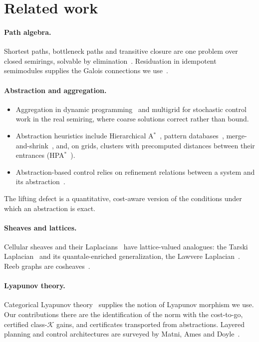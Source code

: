 \documentclass[11pt]{article}
\theoremstyle{definition}
\theoremstyle{remark}
\begin{document}
\section{Related work}

\paragraph{Path algebra.}
Shortest paths, bottleneck paths and transitive closure are one problem over
closed semirings, solvable by elimination~\cite{carre1971,lehmann1977,tarjan1981,
gondran2008}. Residuation in idempotent semimodules supplies the Galois
connections we use~\cite{baccelli1992,cohen2004}.

\paragraph{Abstraction and aggregation.}
\begin{itemize}[nosep]
\item Aggregation in dynamic programming~\cite{bertsekas1989} and multigrid for
  stochastic control~\cite{chow1991} work in the real semiring, where coarse
  solutions correct rather than bound.
\item Abstraction heuristics include Hierarchical A$^*$~\cite{holte1996},
  pattern databases~\cite{culberson1998}, merge-and-shrink~\cite{helmert2007},
  and, on grids, clusters with precomputed distances between their entrances
  (HPA$^*$~\cite{botea2004}).
\item Abstraction-based control relies on refinement relations between a system
  and its abstraction~\cite{tabuada2009,reissig2017}.
\end{itemize}
The lifting defect is a quantitative, cost-aware version of the conditions under
which an abstraction is exact.

\paragraph{Sheaves and lattices.}
Cellular sheaves and their Laplacians~\cite{curry2014,hansen2019} have lattice-valued
analogues: the Tarski Laplacian~\cite{ghrist2022} and its quantale-enriched
generalization, the Lawvere Laplacian~\cite{ghrist2025diffusion}. Reeb graphs are
cosheaves~\cite{desilva2016}.

\paragraph{Lyapunov theory.}
Categorical Lyapunov theory~\cite{ames2025clt1,ames2025clt2} supplies the notion
of Lyapunov morphism we use. Our contributions there are the identification of
the norm with the cost-to-go, certified class-$\mathcal K$ gains, and certificates
transported from abstractions. Layered planning and control architectures are
surveyed by Matni, Ames and Doyle~\cite{matni2024}.
\end{document}
